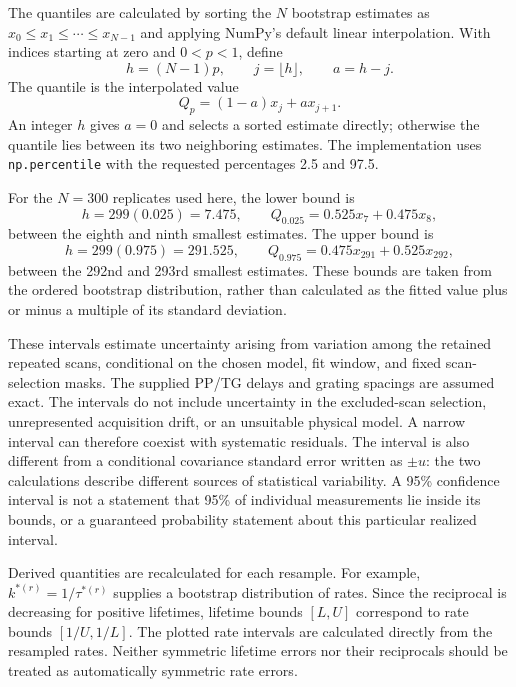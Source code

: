 The quantiles are calculated by sorting the $N$ bootstrap estimates as $x_0\leq x_1\leq\cdots\leq x_{N-1}$ and applying NumPy's default linear interpolation. With indices starting at zero and $0<p<1$, define
\[
h=(N-1)p,\qquad j=\lfloor h\rfloor,\qquad a=h-j.
\]
The quantile is the interpolated value
\[
Q_p=(1-a)x_j+a x_{j+1}.
\]
An integer $h$ gives $a=0$ and selects a sorted estimate directly; otherwise the quantile lies between its two neighboring estimates. The implementation uses \texttt{np.percentile} with the requested percentages 2.5 and 97.5.

For the $N=300$ replicates used here, the lower bound is
\[
h=299(0.025)=7.475,
\qquad Q_{0.025}=0.525x_7+0.475x_8,
\]
between the eighth and ninth smallest estimates. The upper bound is
\[
h=299(0.975)=291.525,
\qquad Q_{0.975}=0.475x_{291}+0.525x_{292},
\]
between the 292nd and 293rd smallest estimates. These bounds are taken from the ordered bootstrap distribution, rather than calculated as the fitted value plus or minus a multiple of its standard deviation.

These intervals estimate uncertainty arising from variation among the retained repeated scans, conditional on the chosen model, fit window, and fixed scan-selection masks. The supplied PP/TG delays and grating spacings are assumed exact. The intervals do not include uncertainty in the excluded-scan selection, unrepresented acquisition drift, or an unsuitable physical model. A narrow interval can therefore coexist with systematic residuals. The interval is also different from a conditional covariance standard error written as $\pm u$: the two calculations describe different sources of statistical variability. A 95\% confidence interval is not a statement that 95\% of individual measurements lie inside its bounds, or a guaranteed probability statement about this particular realized interval.

Derived quantities are recalculated for each resample. For example, $k^{*(r)}=1/\tau^{*(r)}$ supplies a bootstrap distribution of rates. Since the reciprocal is decreasing for positive lifetimes, lifetime bounds $[L,U]$ correspond to rate bounds $[1/U,1/L]$. The plotted rate intervals are calculated directly from the resampled rates. Neither symmetric lifetime errors nor their reciprocals should be treated as automatically symmetric rate errors.

